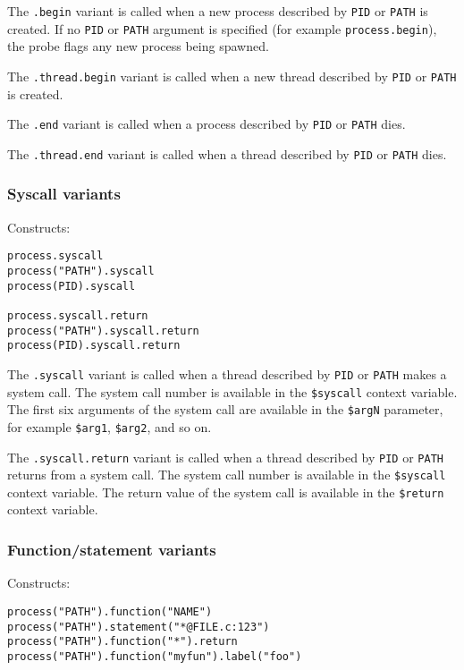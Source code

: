\documentclass[twoside,english]{article}
\newenvironment{vindent}
{\begin{list}{}{\setlength{\listparindent}{6pt}}
\item[]}
{\end{list}}
\begin{document}
The \texttt{.begin} variant is called when a new process described by
\texttt{PID} or \texttt{PATH} is created. If no \texttt{PID} or
\texttt{PATH} argument is specified (for example
\texttt{process.begin}), the probe flags any new process being
spawned.

The \texttt{.thread.begin} variant is called when a new thread
described by \texttt{PID} or \texttt{PATH} is created.

The \texttt{.end} variant is called when a process described by
\texttt{PID} or \texttt{PATH} dies.

The \texttt{.thread.end} variant is called when a thread described by
\texttt{PID} or \texttt{PATH} dies.

\subsubsection{Syscall variants}
\label{sec:syscallvariants}
Constructs:
\begin{vindent}
\begin{verbatim}
process.syscall
process("PATH").syscall
process(PID).syscall

process.syscall.return
process("PATH").syscall.return
process(PID).syscall.return
\end{verbatim}
\end{vindent}

The \texttt{.syscall} variant is called when a thread described by
\texttt{PID} or \texttt{PATH} makes a system call.  The system call
number is available in the \texttt{\$syscall} context variable.  The
first six arguments of the system call are available in the
\texttt{\$argN} parameter, for example \texttt{\$arg1},
\texttt{\$arg2}, and so on.

The \texttt{.syscall.return} variant is called when a thread described
by \texttt{PID} or \texttt{PATH} returns from a system call.  The
system call number is available in the \texttt{\$syscall} context
variable.  The return value of the system call is available in the
\texttt{\$return} context variable.


\subsubsection{Function/statement variants}
\label{sec:function-statement}
Constructs:
\begin{vindent}
\begin{verbatim}
process("PATH").function("NAME")
process("PATH").statement("*@FILE.c:123")
process("PATH").function("*").return
process("PATH").function("myfun").label("foo")
\end{verbatim}
\end{vindent}
\end{document}
